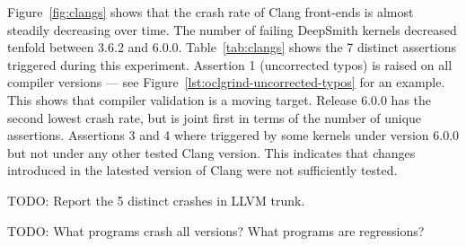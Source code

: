 Figure~\ref{fig:clangs} shows that the crash rate of Clang front-ends is almost steadily decreasing over time. The number of failing DeepSmith kernels decreased tenfold between 3.6.2 and 6.0.0.  
Table~\ref{tab:clangs} shows the 7 distinct assertions triggered during this experiment. Assertion 1 (uncorrected typos) is raised on all compiler versions --- see Figure~\ref{lst:oclgrind-uncorrected-typos} for an example. This shows that compiler validation is a moving target. Release 6.0.0 has the second lowest crash rate, but is joint first in terms of the number of unique assertions. Assertions 3 and 4 where triggered by some kernels under version 6.0.0 but not under any other tested Clang version. This indicates that changes introduced in the latested version of Clang were not sufficiently tested.  %

TODO: Report the 5 distinct crashes in LLVM trunk.

TODO: What programs crash all versions? What programs are regressions?
